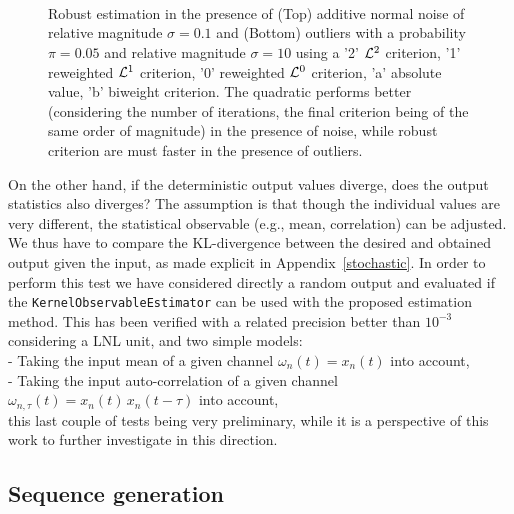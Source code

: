 \begin{figure}[!ht]
  \begin{center}{\small 
     \\
    ~\\
     \\
  }\end{center}
  \caption{Robust estimation in the presence of (Top) additive normal noise of relative magnitude $\sigma = 0.1$ and (Bottom) outliers with a probability $\pi = 0.05$ and relative magnitude $\sigma = 10$ using a '2' ${\cal L}^2$ criterion, '1' reweighted ${\cal L}^1$ criterion, '0' reweighted ${\cal L}^0$ criterion, 'a' absolute value, 'b' biweight criterion. The quadratic performs better (considering the number of iterations, the final criterion being of the same order of magnitude) in the presence of noise, while robust criterion are must faster in the presence of outliers.}
  \label{robust-criterion}
\end{figure}

On the other hand, if the deterministic output values diverge, does the output statistics also diverges? The assumption is that though the individual values are very different, the statistical observable (e.g., mean, correlation) can be adjusted. We thus have to compare the KL-divergence between the desired and obtained output given the input, as made explicit in Appendix~\ref{stochastic}. In order to perform this test we have considered directly a random output and evaluated if the {\tt KernelObservableEstimator} can be used with the proposed estimation method. This has been verified with a related precision better than $10^{-3}$ considering a LNL unit, and two simple models:
\\ - Taking the input mean of a given channel $\omega_n(t) = x_n(t)$ into account,
\\ - Taking the input auto-correlation of a given channel $\omega_{n,\tau}(t) = x_n(t) \, x_n(t - \tau)$ into account,
\\ this last couple of tests being very preliminary, while it is a perspective of this work to further investigate in this direction.

\subsection*{Sequence generation}

